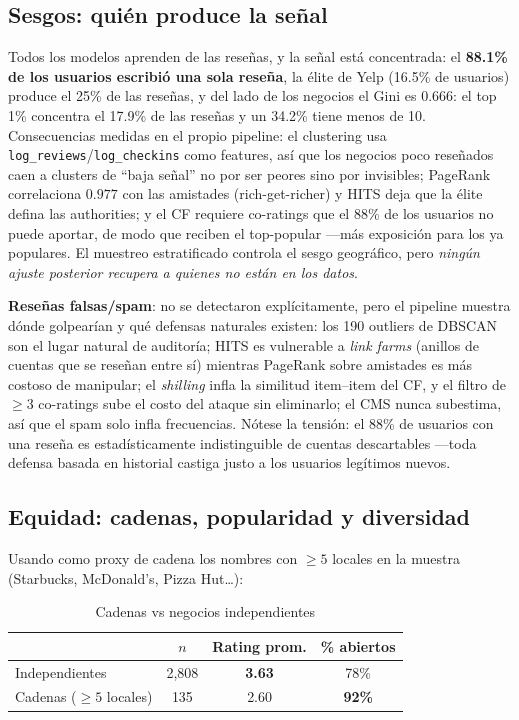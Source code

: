 \documentclass[conference]{IEEEtran}
\begin{document}
\subsection{Sesgos: quién produce la señal}
Todos los modelos aprenden de las reseñas, y la señal está concentrada: el \textbf{88.1\% de los usuarios escribió una sola reseña}, la élite de Yelp (16.5\% de usuarios) produce el 25\% de las reseñas, y del lado de los negocios el Gini es $0.666$: el top 1\% concentra el 17.9\% de las reseñas y un 34.2\% tiene menos de 10. Consecuencias medidas en el propio pipeline: el clustering usa \texttt{log\_reviews}/\texttt{log\_checkins} como features, así que los negocios poco reseñados caen a clusters de ``baja señal'' no por ser peores sino por invisibles; PageRank correlaciona $0.977$ con las amistades (rich-get-richer) y HITS deja que la élite defina las authorities; y el CF requiere co-ratings que el 88\% de los usuarios no puede aportar, de modo que reciben el top-popular ---más exposición para los ya populares. El muestreo estratificado controla el sesgo geográfico, pero \emph{ningún ajuste posterior recupera a quienes no están en los datos}.

\textbf{Reseñas falsas/spam}: no se detectaron explícitamente, pero el pipeline muestra dónde golpearían y qué defensas naturales existen: los 190 outliers de DBSCAN son el lugar natural de auditoría; HITS es vulnerable a \emph{link farms} (anillos de cuentas que se reseñan entre sí) mientras PageRank sobre amistades es más costoso de manipular; el \emph{shilling} infla la similitud item--item del CF, y el filtro de $\geq 3$ co-ratings sube el costo del ataque sin eliminarlo; el CMS nunca subestima, así que el spam solo infla frecuencias. Nótese la tensión: el 88\% de usuarios con una reseña es estadísticamente indistinguible de cuentas descartables ---toda defensa basada en historial castiga justo a los usuarios legítimos nuevos.

\subsection{Equidad: cadenas, popularidad y diversidad}
Usando como proxy de cadena los nombres con $\geq 5$ locales en la muestra (Starbucks, McDonald's, Pizza Hut\ldots):

\begin{table}[H]
  \caption{Cadenas vs negocios independientes}
  \centering
  \begin{tabular}{lccc}
    \toprule
     & $n$ & Rating prom. & \% abiertos \\
    \midrule
    Independientes & 2{,}808 & \textbf{3.63} & 78\% \\
    Cadenas ($\geq 5$ locales) & 135 & 2.60 & \textbf{92\%} \\
    \bottomrule
  \end{tabular}
  \label{tab:cadenas}
\end{table}
\end{document}
